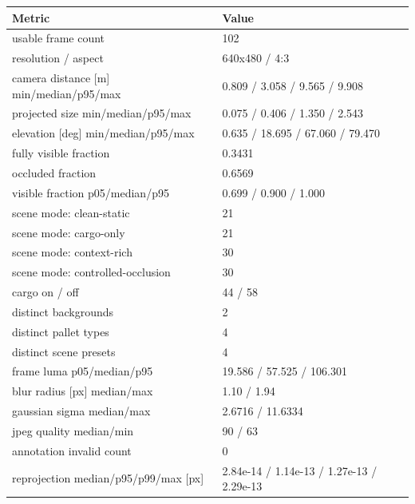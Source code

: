 \begin{tabular}{ll}
\toprule
Metric & Value \\
\midrule
usable frame count & 102 \\
resolution / aspect & 640x480 / 4:3 \\
camera distance [m] min/median/p95/max & 0.809 / 3.058 / 9.565 / 9.908 \\
projected size min/median/p95/max & 0.075 / 0.406 / 1.350 / 2.543 \\
elevation [deg] min/median/p95/max & 0.635 / 18.695 / 67.060 / 79.470 \\
fully visible fraction & 0.3431 \\
occluded fraction & 0.6569 \\
visible fraction p05/median/p95 & 0.699 / 0.900 / 1.000 \\
scene mode: clean-static & 21 \\
scene mode: cargo-only & 21 \\
scene mode: context-rich & 30 \\
scene mode: controlled-occlusion & 30 \\
cargo on / off & 44 / 58 \\
distinct backgrounds & 2 \\
distinct pallet types & 4 \\
distinct scene presets & 4 \\
frame luma p05/median/p95 & 19.586 / 57.525 / 106.301 \\
blur radius [px] median/max & 1.10 / 1.94 \\
gaussian sigma median/max & 2.6716 / 11.6334 \\
jpeg quality median/min & 90 / 63 \\
annotation invalid count & 0 \\
reprojection median/p95/p99/max [px] & 2.84e-14 / 1.14e-13 / 1.27e-13 / 2.29e-13 \\
\bottomrule
\end{tabular}
